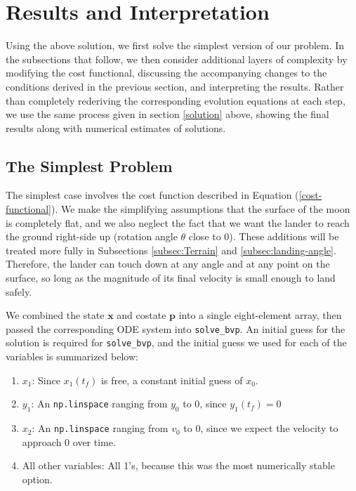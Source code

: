 \documentclass{article}
\begin{document}
\section{Results and Interpretation}
Using the above solution, we first solve the simplest version of our problem. In the subsections that follow, we then consider additional layers of complexity by modifying the cost functional, discussing the accompanying changes to the conditions
derived in the previous section, and interpreting the results.
Rather than completely rederiving the corresponding evolution equations at each step, we use the same process given in section \ref{solution} above, showing the final results along with numerical estimates of solutions.

\subsection{The Simplest Problem}
The simplest case involves the cost function described in Equation (\ref{cost-functional}). We make the simplifying assumptions that the surface of the moon is completely flat, and we also neglect the fact that we want the lander to reach the ground right-side up (rotation angle $\theta$ close to 0). These additions will be treated more fully in Subsections \ref{subsec:Terrain} and \ref{subsec:landing-angle}. Therefore, the lander can touch down at any angle and at any point on the surface, so long as the magnitude of its final velocity is small enough to land safely.

We combined the state $\mathbf{x}$ and costate $\mathbf{p}$ into a single eight-element array, then passed the corresponding ODE system into \texttt{solve\_bvp}. An initial guess for the solution is required for \texttt{solve\_bvp}, and the initial guess we used for each of the variables is summarized below:
\begin{enumerate}
    \item $x_1$: Since $x_1(t_f)$ is free, a constant initial guess of $x_0$.
    \item $y_1$: An \texttt{np.linspace} ranging from $y_0$ to $0$, since $y_1(t_f) = 0$
    \item $x_2$:  An \texttt{np.linspace} ranging from $v_0$ to $0$, since we expect the velocity to approach 0 over time.
    \item All other variables: All 1's, because this was the most numerically stable option.
\end{enumerate}
\end{document}
